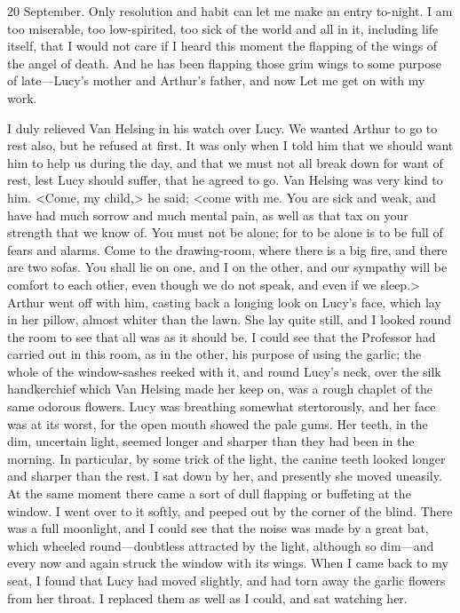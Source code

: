 \begin{diary}{20 September.}
Only resolution and habit can let me make an entry to-night. I am too miserable, too low-spirited, too sick of the world and all in it, including life itself, that I would not care if I heard this moment the flapping of the wings of the angel of death. And he has been flapping those grim wings to some purpose of late—Lucy's mother and Arthur's father, and now Let me get on with my work.

I duly relieved Van Helsing in his watch over Lucy. We wanted Arthur to go to rest also, but he refused at first. It was only when I told him that we should want him to help us during the day, and that we must not all break down for want of rest, lest Lucy should suffer, that he agreed to go. Van Helsing was very kind to him. <Come, my child,> he said; <come with me. You are sick and weak, and have had much sorrow and much mental pain, as well as that tax on your strength that we know of. You must not be alone; for to be alone is to be full of fears and alarms. Come to the drawing-room, where there is a big fire, and there are two sofas. You shall lie on one, and I on the other, and our sympathy will be comfort to each other, even though we do not speak, and even if we sleep.> Arthur went off with him, casting back a longing look on Lucy's face, which lay in her pillow, almost whiter than the lawn. She lay quite still, and I looked round the room to see that all was as it should be. I could see that the Professor had carried out in this room, as in the other, his purpose of using the garlic; the whole of the window-sashes reeked with it, and round Lucy's neck, over the silk handkerchief which Van Helsing made her keep on, was a rough chaplet of the same odorous flowers. Lucy was breathing somewhat stertorously, and her face was at its worst, for the open mouth showed the pale gums. Her teeth, in the dim, uncertain light, seemed longer and sharper than they had been in the morning. In particular, by some trick of the light, the canine teeth looked longer and sharper than the rest. I sat down by her, and presently she moved uneasily. At the same moment there came a sort of dull flapping or buffeting at the window. I went over to it softly, and peeped out by the corner of the blind. There was a full moonlight, and I could see that the noise was made by a great bat, which wheeled round—doubtless attracted by the light, although so dim—and every now and again struck the window with its wings. When I came back to my seat, I found that Lucy had moved slightly, and had torn away the garlic flowers from her throat. I replaced them as well as I could, and sat watching her.


\end{diary}
